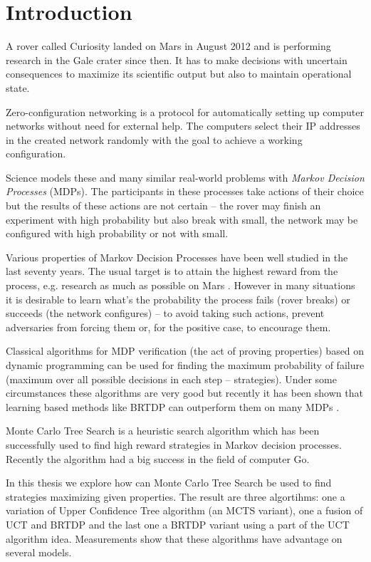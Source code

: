 \chapter{Introduction}

A rover called Curiosity landed on Mars in August 2012 and is performing
research in the Gale crater since then. It has to make decisions with
uncertain consequences to maximize its scientific output but also to maintain
operational state.

Zero-configuration networking is a protocol for automatically setting up
computer networks without need for external help. The computers
select their IP addresses in the created network randomly with the goal
to achieve a working configuration.

Science models these and many similar real-world problems with {\em
Markov Decision Processes} (MDPs). The participants in these processes take
actions of their choice but the results of these actions are not
certain -- the rover may finish an experiment with high probability but
also break with small, the network may be configured with high
probability or not with small.

Various properties of Markov Decision Processes have been well studied
in the last seventy years. The usual target is to attain the highest
reward from the process, e.g. research as much as possible on Mars
\parencite{MarsRover}.
However in many situations it is desirable to learn what's the
probability the process fails (rover breaks) or succeeds (the network
configures) -- to avoid taking such actions, prevent
adversaries from forcing them or, for the positive case, to encourage them.

Classical algorithms for MDP verification (the act of proving
properties) based on dynamic programming can be used for finding the
maximum probability of failure (maximum over all possible decisions in
each step -- strategies). Under some circumstances these algorithms are
very good but recently it has been shown that learning based methods
like BRTDP can outperform them on many MDPs \parencite{atva14}.

Monte Carlo Tree Search is a heuristic search algorithm which has been
successfully used to find high reward strategies in Markov decision
processes. Recently the algorithm had a big success in the field of
computer Go.

In this thesis we explore how can Monte Carlo Tree Search be used to
find strategies maximizing given properties. The result are three
algortihms: one a variation of Upper Confidence Tree algorithm (an MCTS
variant), one a fusion of UCT and BRTDP and the last one a BRTDP variant
using a part of the UCT algorithm idea.  Measurements show that these
algorithms have advantage on several models.

